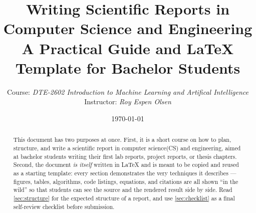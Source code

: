 \documentclass[11pt,a4paper]{article}
\title{%
  \AddToHook{shipout/background}{%
  \ifnum\value{page}=1
    \uitTitleLogo
  \fi
}
  \Large
  \textcolor{uitDarkBlue}{%
    \textbf{Writing Scientific Reports in\\
    Computer Science and Engineering}%
  }
  \\[0.3em]
  \large
  A Practical Guide and \LaTeX{} Template for Bachelor Students
}
\author{
  Course: \emph{DTE-2602 Introduction to Machine Learning and Artifical Intelligence}\\
  Instructor: \emph{Roy Espen Olsen}
}
\date{\today}
\begin{document}
\maketitle

\begin{abstract}
This document has two purposes at once. First, it is a short course on how to
plan, structure, and write a scientific report in computer science(CS) and
engineering, aimed at bachelor students writing their first lab reports,
project reports, or thesis chapters. Second, the document \emph{is itself}
written in \LaTeX{} and is meant to be copied and reused as a starting
template: every section demonstrates the very techniques it describes ---
figures, tables, algorithms, code listings, equations, and citations are
all shown ``in the wild'' so that students can see the source and the
rendered result side by side. Read \cref{sec:structure} for the expected
structure of a report, and use \cref{sec:checklist} as a final
self-review checklist before submission.
\end{abstract}

\newpage
\tableofcontents
\thispagestyle{fancy}
\newpage


\newpage

\newpage

\newpage

\newpage

\newpage

\newpage

\newpage

\newpage

\newpage



\end{document}

